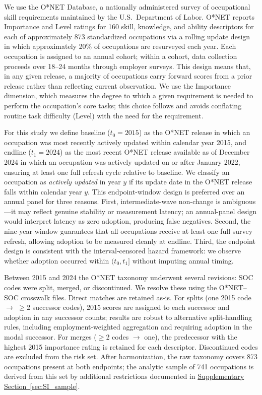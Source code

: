 \documentclass[11pt, letterpaper]{article} %
\newcommand{\textcite}[1]{\cite{#1}}
\begin{document}
We use the O*NET Database, a nationally administered survey of occupational skill requirements maintained by the U.S.\ Department of Labor. O*NET reports Importance and Level ratings for 160 skill, knowledge, and ability descriptors for each of approximately 873 standardized occupations via a rolling update design in which approximately 20\% of occupations are resurveyed each year. Each occupation is assigned to an annual cohort; within a cohort, data collection proceeds over 18--24 months through employer surveys. This design means that, in any given release, a majority of occupations carry forward scores from a prior release rather than reflecting current observation. We use the Importance dimension, which measures the degree to which a given requirement is needed to perform the occupation's core tasks; this choice follows \textcite{alabdulkareem_unpacking_2018} and avoids conflating routine task difficulty (Level) with the need for the requirement.
 
For this study we define baseline ($t_0 = 2015$) as the O*NET release in which an occupation was most recently actively updated within calendar year 2015, and endline ($t_1 = 2024$) as the most recent O*NET release available as of December 2024 in which an occupation was actively updated on or after January 2022, ensuring at least one full refresh cycle relative to baseline. We classify an occupation as \emph{actively updated} in year $y$ if its update date in the O*NET release falls within calendar year $y$. This endpoint-window design is preferred over an annual panel for three reasons. First, intermediate-wave non-change is ambiguous---it may reflect genuine stability or measurement latency; an annual-panel design would interpret latency as zero adoption, producing false negatives. Second, the nine-year window guarantees that all occupations receive at least one full survey refresh, allowing adoption to be measured cleanly at endline. Third, the endpoint design is consistent with the interval-censored hazard framework: we observe whether adoption occurred within $(t_0, t_1]$ without imputing annual timing.
 
Between 2015 and 2024 the O*NET taxonomy underwent several revisions: SOC codes were split, merged, or discontinued. We resolve these using the O*NET--SOC crosswalk files. Direct matches are retained as-is. For splits (one 2015 code $\to$ $\geq$2 successor codes), 2015 scores are assigned to each successor and adoption in any successor counts; results are robust to alternative split-handling rules, including employment-weighted aggregation and requiring adoption in the modal successor. For merges ($\geq$2 codes $\to$ one), the predecessor with the highest 2015 importance rating is retained for each descriptor. Discontinued codes are excluded from the risk set. After harmonization, the raw taxonomy covers 873 occupations present at both endpoints; the analytic sample of 741 occupations is derived from this set by additional restrictions documented in \hyperref[sec:SI_sample]{Supplementary Section~\ref*{sec:SI_sample}}.
\end{document}
